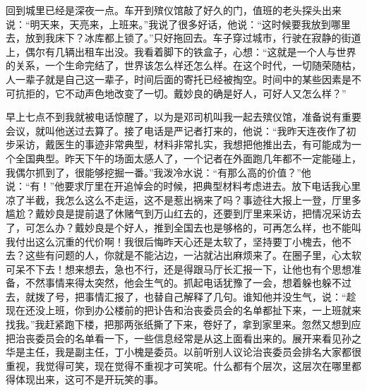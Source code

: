 \documentclass[12pt,oneside]{book}
\begin{document}
回到城里已经是深夜一点。车开到殡仪馆敲了好久的门，值班的老头探头出来说：``明天来，天亮来，上班来。''我说了很多好话，他说：``这时候要我放到哪里去，放到我床下？冰库都上锁了。''只好拖回去。车子穿过城市，行驶在寂静的街道上，偶尔有几辆出租车出没。我看着脚下的铁盒子，心想：``这就是一个人与世界的关系，一个生命完结了，世界该怎么样还怎么样。在这个时代，一切随荣随枯，人一辈子就是自己这一辈子，时间后面的寄托已经被掏空。时间中的某些因素是不可抗拒的，它不动声色地改变了一切。戴妙良的确是好人，可好人又怎么样？''

早上七点不到我就被电话惊醒了，以为是邓司机叫我一起去殡仪馆，准备说有重要会议，就叫他送过去算了。接了电话是严记者打来的，他说：``我昨天连夜作了初步采访，戴医生的事迹非常典型，材料非常扎实，我想把他推出去，有可能成为一个全国典型。昨天下午的场面太感人了，一个记者在外面跑几年都不一定能碰上，我偶尔抓到了，很能够挖掘一番。''我泼冷水说：``有那么高的价值？''他说：``有！''他要求厅里在开追悼会的时候，把典型材料考虑进去。放下电话我心里凉了半截，我怎么这么不走运，这不是惹出祸来了吗？事迹往大报上一登，厅里多尴尬？戴妙良是提前退了休赌气到万山红去的，还要到厅里来采访，把情况采访去了，可怎么办？戴妙良是个好人，推到全国去也是够格的，可再怎么样，也不能叫我付出这么沉重的代价啊！我很后悔昨天心还是太软了，坚持要丁小槐去，他不去？这些有问题的人，你就是不能沾边，一沾就沾出麻烦来了。在圈子里，心太软可呆不下去！想来想去，急也不行，还是得跟马厅长汇报一下，让他也有个思想准备，不然事情来得太突然，他会生气的。抓起电话犹豫了一会，想着躲也躲不过去，就拨了号，把事情汇报了，也替自己解释了几句。谁知他并没生气，说：``趁现在还没上班，你到办公楼前的把讣告和治丧委员会的名单都扯下来，一上班就来找我。''我赶紧跑下楼，把那两张纸撕了下来，卷好了，拿到家里来。忽然又想到应把治丧委员会的名单看一下，一些信息经常是从这上面看出来的。展开来看见孙之华是主任，我是副主任，丁小槐是委员。以前听别人议论治丧委员会排名大家都很重视，我觉得可笑，现在觉得不重视才可笑呢。什么都有个层次，这层次在哪里都得体现出来，这可不是开玩笑的事。
\end{document}
